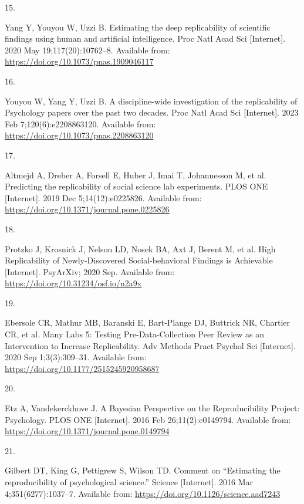 \documentclass[
  english,
  a4paper,
]{article}
\newlength{\cslhangindent}
\newlength{\csllabelwidth}
\newlength{\cslentryspacingunit} %
\newenvironment{CSLReferences}[2] %
 {%
  \setlength{\parindent}{0pt}
  \ifodd #1
  \let\oldpar\par
  \def\par{\hangindent=\cslhangindent\oldpar}
  \fi
  \setlength{\parskip}{#2\cslentryspacingunit}
 }%
 {}
\newcommand{\CSLLeftMargin}[1]{\parbox[t]{\csllabelwidth}{#1}}
\newcommand{\CSLRightInline}[1]{\parbox[t]{\linewidth - \csllabelwidth}{#1}\break}
\begin{document}
\begin{CSLReferences}{0}{0}
\leavevmode{}%
\CSLLeftMargin{15. }%
\CSLRightInline{Yang Y, Youyou W, Uzzi B. Estimating the deep replicability of scientific findings using human and artificial intelligence. Proc Natl Acad Sci {[}Internet{]}. 2020 May 19;117(20):10762--8. Available from: \url{https://doi.org/10.1073/pnas.1909046117}}

\leavevmode{}%
\CSLLeftMargin{16. }%
\CSLRightInline{Youyou W, Yang Y, Uzzi B. A discipline-wide investigation of the replicability of {Psychology} papers over the past two decades. Proc Natl Acad Sci {[}Internet{]}. 2023 Feb 7;120(6):e2208863120. Available from: \url{https://doi.org/10.1073/pnas.2208863120}}

\leavevmode{}%
\CSLLeftMargin{17. }%
\CSLRightInline{Altmejd A, Dreber A, Forsell E, Huber J, Imai T, Johannesson M, et al. Predicting the replicability of social science lab experiments. PLOS ONE {[}Internet{]}. 2019 Dec 5;14(12):e0225826. Available from: \url{https://doi.org/10.1371/journal.pone.0225826}}

\leavevmode{}%
\CSLLeftMargin{18. }%
\CSLRightInline{Protzko J, Krosnick J, Nelson LD, Nosek BA, Axt J, Berent M, et al. High {Replicability} of {Newly-Discovered Social-behavioral Findings} is {Achievable} {[}Internet{]}. {PsyArXiv}; 2020 Sep. Available from: \url{https://doi.org/10.31234/osf.io/n2a9x}}

\leavevmode{}%
\CSLLeftMargin{19. }%
\CSLRightInline{Ebersole CR, Mathur MB, Baranski E, Bart-Plange DJ, Buttrick NR, Chartier CR, et al. Many {Labs} 5: {Testing Pre-Data-Collection Peer Review} as an {Intervention} to {Increase Replicability}. Adv Methods Pract Psychol Sci {[}Internet{]}. 2020 Sep 1;3(3):309--31. Available from: \url{https://doi.org/10.1177/2515245920958687}}

\leavevmode{}%
\CSLLeftMargin{20. }%
\CSLRightInline{Etz A, Vandekerckhove J. A {Bayesian Perspective} on the {Reproducibility Project}: {Psychology}. PLOS ONE {[}Internet{]}. 2016 Feb 26;11(2):e0149794. Available from: \url{https://doi.org/10.1371/journal.pone.0149794}}

\leavevmode{}%
\CSLLeftMargin{21. }%
\CSLRightInline{Gilbert DT, King G, Pettigrew S, Wilson TD. Comment on {``{Estimating} the reproducibility of psychological science.''} Science {[}Internet{]}. 2016 Mar 4;351(6277):1037--7. Available from: \url{https://doi.org/10.1126/science.aad7243}}


\end{CSLReferences}
\end{document}
